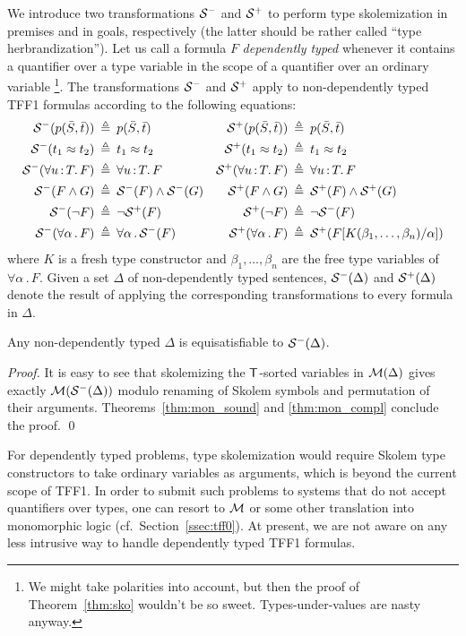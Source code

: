 We introduce two transformations $\mathcal{S}^-$ and $\mathcal{S}^+$ to
perform type skolemization in premises and in goals, respectively
(the latter should be rather called ``type herbrandization'').
Let us call a formula $F$ {\em dependently typed} whenever
it contains a quantifier over a type variable in the scope
of a quantifier over an ordinary variable%
\footnote{We might take polarities into account, but then
the proof of Theorem~\ref{thm:sko} wouldn't be so sweet.
Types-under-values are nasty anyway.}.
The transformations $\mathcal{S}^-$ and $\mathcal{S}^+$ apply to
non-dependently typed TFF1 formulas according to the
following equations:
\begin{align*}
\mathcal{S}^-(p(\bar{S},\bar{t})) &\:\triangleq\: p(\bar{S},\bar{t}) &
\mathcal{S}^+(p(\bar{S},\bar{t})) &\:\triangleq\: p(\bar{S},\bar{t}) \\
\mathcal{S}^-(t_1 \approx t_2) &\:\triangleq\: t_1 \approx t_2 &
\mathcal{S}^+(t_1 \approx t_2) &\:\triangleq\: t_1 \approx t_2 \\
\mathcal{S}^-(\forall u \operatorname{:} T .\, F) &\:\triangleq\: \forall u \operatorname{:} T .\, F &
\mathcal{S}^+(\forall u \operatorname{:} T .\, F) &\:\triangleq\: \forall u \operatorname{:} T .\, F \\
\mathcal{S}^-(F \land G) &\:\triangleq\: \mathcal{S}^-(F) \land \mathcal{S}^-(G) &
\mathcal{S}^+(F \land G) &\:\triangleq\: \mathcal{S}^+(F) \land \mathcal{S}^+(G) \\
\mathcal{S}^-(\lnot F) &\:\triangleq\: \lnot \mathcal{S}^+(F) &
\mathcal{S}^+(\lnot F) &\:\triangleq\: \lnot \mathcal{S}^-(F) \\
\mathcal{S}^-(\forall \alpha \,.\, F) &\:\triangleq\: \forall \alpha \,.\, \mathcal{S}^-(F) &
\mathcal{S}^+(\forall \alpha \,.\, F) &\:\triangleq\:
\mathcal{S}^+(F[K(\beta_1,\dots,\beta_n)/\alpha])
\end{align*}
where $K$ is a fresh type constructor and $\beta_1,\dots,\beta_n$ are
the free type variables of $\forall \alpha \,.\, F$.
Given a set $\Delta$ of non-dependently typed sentences,
$\mathcal{S}^-(\Delta)$ and $\mathcal{S}^+(\Delta)$ denote the result of applying
the corresponding transformations to every formula in $\Delta$.

\begin{theorem} \label{thm:sko}
Any non-dependently typed $\Delta$ is equisatisfiable to $\mathcal{S}^-(\Delta)$.
\end{theorem}
\begin{proof}
It is easy to see that
skolemizing the $\mathsf{T}$-sorted variables in $\mathcal{M}(\Delta)$ gives
exactly $\mathcal{M}(\mathcal{S}^-(\Delta))$ modulo renaming of Skolem symbols and
permutation of their arguments. Theorems~\ref{thm:mon_sound} and
\ref{thm:mon_compl} conclude the proof.
\qed
\end{proof}

For dependently typed problems, type skolemization would require
Skolem type constructors to take ordinary variables as arguments,
which is beyond the current scope of TFF1. In order to submit such
problems to systems that do not accept quantifiers over types,
one can resort to $\mathcal{M}$ or some other translation into monomorphic
logic (cf.~Section~\ref{ssec:tff0}). At present, we are not aware
on any less intrusive way to handle dependently typed TFF1 formulas.

